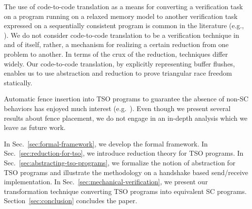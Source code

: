 \documentclass[preprint,9pt]{sigplanconf}
\begin{document}
The use of code-to-code translation as a means for converting a verification task on a program running on a relaxed memory model to another verification task expressed on a sequentially consistent program is common in the literature (e.g., \cite{FBP2011,BDM2013,DMV+2013,AKN+2013}). 
We do not consider code-to-code translation to be a verification technique in and of itself, rather, a mechanism for realizing a certain reduction from one problem to another. 
In terms of the crux of the reduction, techniques differ widely. 
Our code-to-code translation, by explicitly representing buffer flushes, enables us to use abstraction and reduction to prove triangular race freedom statically. 

Automatic fence insertion into TSO programs to guarantee the absence of non-SC behaviors has enjoyed much interest (e.g.~\cite{AAC+2012,AAC+2013,BAM2007,FLM2003,LNP+2012,VN2011}).
Even though we present several results about fence placement, we do not engage in an in-depth analysis which we leave as future work.



In Sec.~\ref{sec:formal-framework}, we develop the formal framework.
In Sec.~\ref{sec:reduction-for-tso}, we introduce reduction theory for TSO programs.
In Sec.~\ref{sec:abstracting-tso-programs}, we formalize the notion of abstraction for TSO programs and illustrate the methodology on a handshake based send/receive implementation.
In Sec.~\ref{sec:mechanical-verification}, we present our transformation technique converting TSO programs into equivalent SC programs.
Section~\ref{sec:conclusion} concludes the paper.
\end{document}
